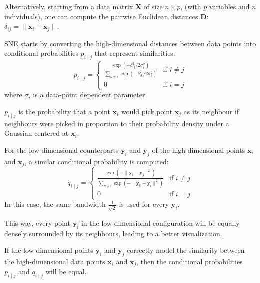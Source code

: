 Alternatively, starting from a data matrix $\boldsymbol X$ of size $n \times p$,
(with $p$ variables and $n$ individuals), one can compute the pairwise
Euclidean distances $\boldsymbol D$: $\delta_{ij} = \lVert \boldsymbol x_i - \boldsymbol x_j \rVert$.

SNE starts by converting the high-dimensional distances between data points
into conditional probabilities $p_{i \mid j}$ that represent similarities:
\begin{equation*}
	p_{i \mid j} =
	\begin{cases}
		\frac{\exp(-\delta_{ij}^2 / 2\sigma_i^2)}{\sum_{k \neq i} \exp(-\delta_{ik}^2 / 2\sigma_i^2)} & \text{if } i \neq j \\
		0                                                                                             & \text{if } i = j
	\end{cases}
\end{equation*}
where $\sigma_i$ is a data-point dependent  parameter.

\begin{note}
	$p_{i \mid j}$ is the probability that a point $\boldsymbol x_i$ would pick
	point $\boldsymbol x_j$ as its neighbour if neighbours were picked in proportion
	to their probability density under a Gaussian centered at $\boldsymbol x_i$.
\end{note}

For the low-dimensional counterparts $\boldsymbol y_i$ and $\boldsymbol y_j$ of
the high-dimensional points $\boldsymbol x_i$ and $\boldsymbol x_j$, a similar
conditional probability is computed:
\begin{equation*}
	q_{i \mid j} =
	\begin{cases}
		\frac{\exp(-\lVert \boldsymbol y_i - \boldsymbol y_j \rVert^2)}{\sum_{k \neq i} \exp(-\lVert \boldsymbol y_k - \boldsymbol y_i \rVert^2)} & \text{if } i \neq j \\
		0                                                                                                                                         & \text{if } i = j
	\end{cases}
\end{equation*}
In this case, the same bandwidth $\frac{1}{\sqrt{2}}$ is used for every $\boldsymbol y_i$.

This way, every point $\boldsymbol y_i$ in the low-dimensional configuration will be
equally densely surrounded by its neighbours, leading to a better visualization.

If the low-dimensional points $\boldsymbol y_i$ and $\boldsymbol y_j$ correctly model
the similarity between the high-dimensional data points $\boldsymbol x_i$ and $\boldsymbol x_j$,
then the conditional probabilities $p_{i \mid j}$ and $q_{i \mid j}$ will be equal.

